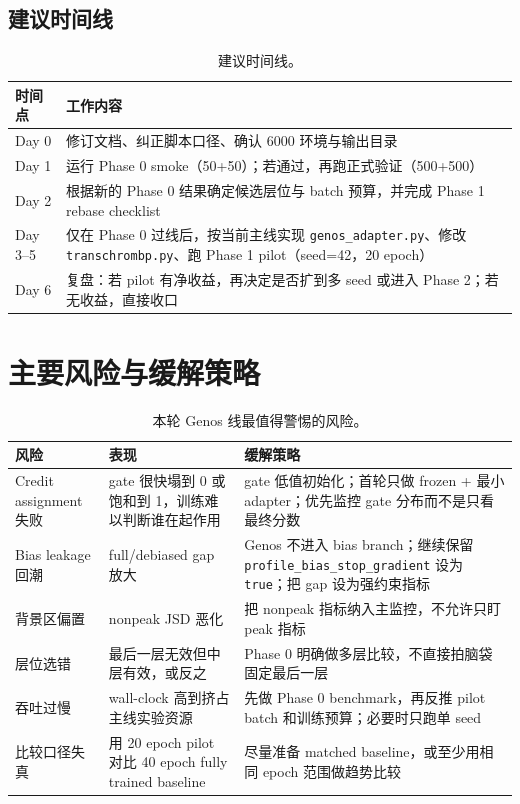 \documentclass[11pt,a4paper]{ctexart}
\begin{document}
\subsection{建议时间线}

\begin{table}[H]
\centering
\small
\caption{建议时间线。}
\label{tab:timeline}
\begin{tabularx}{\textwidth}{l Y}
\toprule
时间点 & 工作内容 \\
\midrule
Day 0 & 修订文档、纠正脚本口径、确认 6000 环境与输出目录 \\
Day 1 & 运行 Phase 0 smoke（50+50）；若通过，再跑正式验证（500+500） \\
Day 2 & 根据新的 Phase 0 结果确定候选层位与 batch 预算，并完成 Phase 1 rebase checklist \\
Day 3--5 & 仅在 Phase 0 过线后，按当前主线实现 \texttt{genos\_adapter.py}、修改 \texttt{transchrombp.py}、跑 Phase 1 pilot（seed=42，20 epoch） \\
Day 6 & 复盘：若 pilot 有净收益，再决定是否扩到多 seed 或进入 Phase 2；若无收益，直接收口 \\
\bottomrule
\end{tabularx}
\end{table}

\section{主要风险与缓解策略}

\begin{table}[H]
\centering
\small
\caption{本轮 Genos 线最值得警惕的风险。}
\label{tab:risk}
\begin{tabularx}{\textwidth}{l Y Y}
\toprule
风险 & 表现 & 缓解策略 \\
\midrule
Credit assignment 失败 & gate 很快塌到 0 或饱和到 1，训练难以判断谁在起作用 & gate 低值初始化；首轮只做 frozen + 最小 adapter；优先监控 gate 分布而不是只看最终分数 \\
Bias leakage 回潮 & full/debiased gap 放大 & Genos 不进入 bias branch；继续保留 \texttt{profile\_bias\_stop\_gradient} 设为 \texttt{true}；把 gap 设为强约束指标 \\
背景区偏置 & nonpeak JSD 恶化 & 把 nonpeak 指标纳入主监控，不允许只盯 peak 指标 \\
层位选错 & 最后一层无效但中层有效，或反之 & Phase 0 明确做多层比较，不直接拍脑袋固定最后一层 \\
吞吐过慢 & wall-clock 高到挤占主线实验资源 & 先做 Phase 0 benchmark，再反推 pilot batch 和训练预算；必要时只跑单 seed \\
比较口径失真 & 用 20 epoch pilot 对比 40 epoch fully trained baseline & 尽量准备 matched baseline，或至少用相同 epoch 范围做趋势比较 \\
\bottomrule
\end{tabularx}
\end{table}
\end{document}
